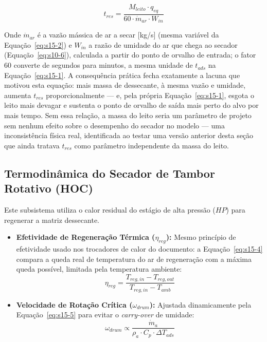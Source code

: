 \documentclass[12pt,a4paper]{article}
\numberwithin{equation}{section}
\numberwithin{table}{section}
\numberwithin{figure}{section}
\begin{document}
		\begin{equation}\label{eq:s15-14}
		t_{res} = \frac{M_{leito} \cdot q_{eq}}{60 \cdot \dot{m}_{ar} \cdot W_{in}}
		\end{equation}

		Onde $\dot{m}_{ar}$ é a vazão mássica de ar a secar [kg/s] (mesma variável da Equação~\eqref{eq:s15-2}) e $W_{in}$ a razão de umidade do ar que chega ao secador (Equação~\eqref{eq:s10-6}), calculada a partir do ponto de orvalho de entrada; o fator 60 converte de segundos para minutos, a mesma unidade de $t_{ads}$ na Equação~\eqref{eq:s15-1}. A consequência prática fecha exatamente a lacuna que motivou esta equação: mais massa de dessecante, à mesma vazão e umidade, aumenta $t_{res}$ proporcionalmente — e, pela própria Equação~\eqref{eq:s15-1}, esgota o leito mais devagar e sustenta o ponto de orvalho de saída mais perto do alvo por mais tempo. Sem essa relação, a massa do leito seria um parâmetro de projeto sem nenhum efeito sobre o desempenho do secador no modelo — uma inconsistência física real, identificada ao testar uma versão anterior desta seção que ainda tratava $t_{res}$ como parâmetro independente da massa do leito.

		\subsection{\textbf{Termodinâmica do Secador de Tambor Rotativo (HOC)}}
		
		Este subsistema utiliza o calor residual do estágio de alta pressão ($HP$) para regenerar a matriz dessecante.
		
		\begin{itemize}
			\item \textbf{Efetividade de Regeneração Térmica ($\eta_{reg}$):} Mesmo princípio de efetividade usado nos trocadores de calor do documento: a Equação~\eqref{eq:s15-4} compara a queda real de temperatura do ar de regeneração com a máxima queda possível, limitada pela temperatura ambiente:
			\begin{equation}\label{eq:s15-4}
\eta_{reg} = \frac{T_{reg,in} - T_{reg,out}}{T_{reg,in} - T_{amb}}
\end{equation}
			
			\item \textbf{Velocidade de Rotação Crítica ($\omega_{drum}$):}
			Ajustada dinamicamente pela Equação~\eqref{eq:s15-5} para evitar o \textit{carry-over} de umidade:
			\begin{equation}\label{eq:s15-5}
\omega_{drum} \propto \frac{\dot{m}_a}{\rho_a \cdot C_p \cdot \Delta T_{ads}}
\end{equation}
		\end{itemize}
\end{document}
